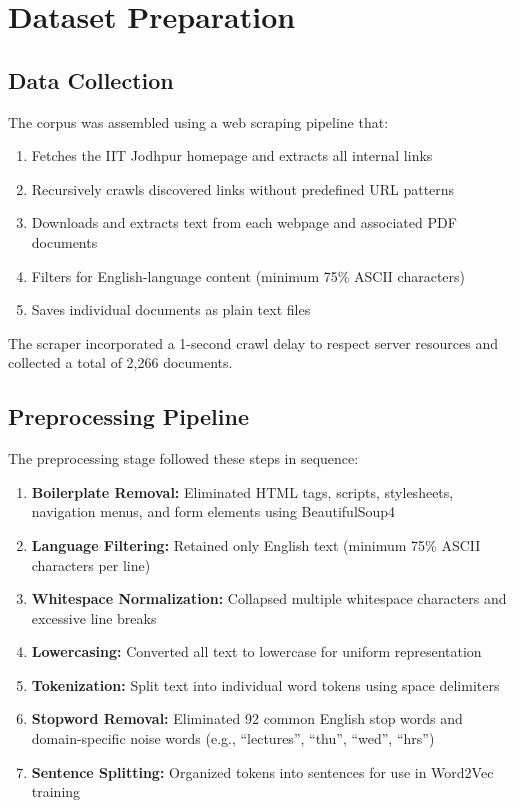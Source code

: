 \documentclass[11pt,a4paper]{report}
\begin{document}
\newpage

\chapter{Dataset Preparation}

\section{Data Collection}
The corpus was assembled using a web scraping pipeline that:
\begin{enumerate}
    \item Fetches the IIT Jodhpur homepage and extracts all internal links
    \item Recursively crawls discovered links without predefined URL patterns
    \item Downloads and extracts text from each webpage and associated PDF documents
    \item Filters for English-language content (minimum 75\% ASCII characters)
    \item Saves individual documents as plain text files
\end{enumerate}

The scraper incorporated a 1-second crawl delay to respect server resources and collected a total of 2,266 documents.

\section{Preprocessing Pipeline}
The preprocessing stage followed these steps in sequence:

\begin{enumerate}
    \item \textbf{Boilerplate Removal:} Eliminated HTML tags, scripts, stylesheets, navigation menus, and form elements using BeautifulSoup4
    \item \textbf{Language Filtering:} Retained only English text (minimum 75\% ASCII characters per line)
    \item \textbf{Whitespace Normalization:} Collapsed multiple whitespace characters and excessive line breaks
    \item \textbf{Lowercasing:} Converted all text to lowercase for uniform representation
    \item \textbf{Tokenization:} Split text into individual word tokens using space delimiters
    \item \textbf{Stopword Removal:} Eliminated 92 common English stop words and domain-specific noise words (e.g., ``lectures'', ``thu'', ``wed'', ``hrs'')
    \item \textbf{Sentence Splitting:} Organized tokens into sentences for use in Word2Vec training
\end{enumerate}
\end{document}
